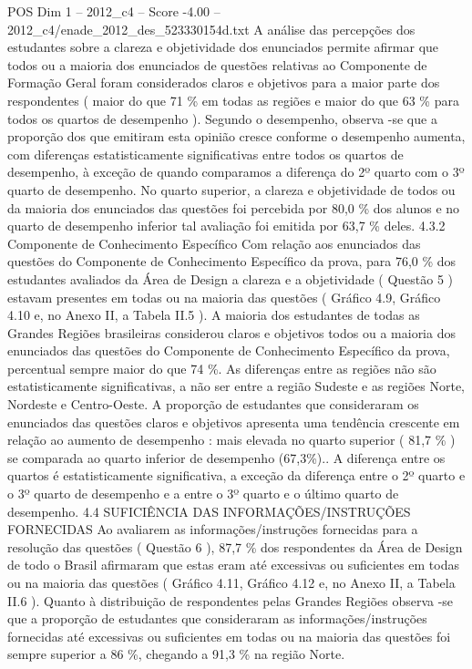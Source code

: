 \begin{textsample}{POS Dim 1 – 2012\_c4 – Score -4.00 – 2012\_c4/enade\_2012\_des\_523330154d.txt}
A análise das percepções dos estudantes sobre a clareza e objetividade dos enunciados permite afirmar que todos ou a maioria dos enunciados de questões relativas ao Componente de Formação Geral foram considerados claros e objetivos para a maior parte dos respondentes ( maior do que 71 \% em todas as regiões e maior do que 63 \% para todos os quartos de desempenho ).
Segundo o desempenho, observa -se que a proporção dos que emitiram esta opinião cresce conforme o desempenho aumenta, com diferenças estatisticamente significativas entre todos os quartos de desempenho, à exceção de quando comparamos a diferença do 2º quarto com o 3º quarto de desempenho.
No quarto superior, a clareza e objetividade de todos ou da maioria dos enunciados das questões foi percebida por 80,0 \% dos alunos e no quarto de desempenho inferior tal avaliação foi emitida por 63,7 \% deles. 4.3.2 Componente de Conhecimento Específico Com relação aos enunciados das questões do Componente de Conhecimento Específico da prova, para 76,0 \% dos estudantes avaliados da Área de Design a clareza e a objetividade ( Questão 5 ) estavam presentes em todas ou na maioria das questões ( Gráfico 4.9, Gráfico 4.10 e, no Anexo II, a Tabela II.5 ).
A maioria dos estudantes de todas as Grandes Regiões brasileiras considerou claros e objetivos todos ou a maioria dos enunciados das questões do Componente de Conhecimento Específico da prova, percentual sempre maior do que 74 \%.
As diferenças entre as regiões não são estatisticamente significativas, a não ser entre a região Sudeste e as regiões Norte, Nordeste e Centro-Oeste.
A proporção de estudantes que consideraram os enunciados das questões claros e objetivos apresenta uma tendência crescente em relação ao aumento de desempenho : mais elevada no quarto superior ( 81,7 \% ) se comparada ao quarto inferior de desempenho (67,3\%)..
A diferença entre os quartos é estatisticamente significativa, a exceção da diferença entre o 2º quarto e o 3º quarto de desempenho e a entre o 3º quarto e o último quarto de desempenho. 4.4 SUFICIÊNCIA DAS INFORMAÇÕES/INSTRUÇÕES FORNECIDAS Ao avaliarem as informações/instruções fornecidas para a resolução das questões ( Questão 6 ), 87,7 \% dos respondentes da Área de Design de todo o Brasil afirmaram que estas eram até excessivas ou suficientes em todas ou na maioria das questões ( Gráfico 4.11, Gráfico 4.12 e, no Anexo II, a Tabela II.6 ).
Quanto à distribuição de respondentes pelas Grandes Regiões observa -se que a proporção de estudantes que consideraram as informações/instruções fornecidas até excessivas ou suficientes em todas ou na maioria das questões foi sempre superior a 86 \%, chegando a 91,3 \% na região Norte.

\end{textsample}
